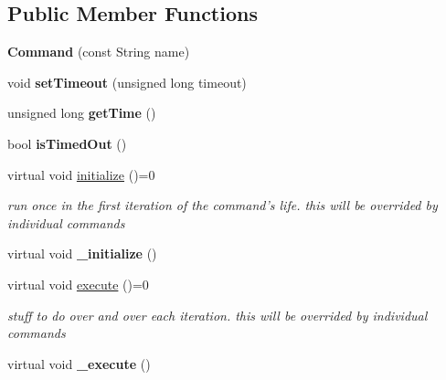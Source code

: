 \subsection*{Public Member Functions}
\begin{DoxyCompactItemize}
\item 
\hypertarget{classCommand_a5f939f31974c4955c486b18a07675698}{{\bfseries Command} (const String name)}\label{classCommand_a5f939f31974c4955c486b18a07675698}

\item 
\hypertarget{classCommand_adfbbaa47b15c80c2a713d24e48b843a8}{void {\bfseries set\-Timeout} (unsigned long timeout)}\label{classCommand_adfbbaa47b15c80c2a713d24e48b843a8}

\item 
\hypertarget{classCommand_a53de8c6445ccd2f51fe7535a71e20c98}{unsigned long {\bfseries get\-Time} ()}\label{classCommand_a53de8c6445ccd2f51fe7535a71e20c98}

\item 
\hypertarget{classCommand_ac62a4b3acc8db6c5e396d5c97ca51a98}{bool {\bfseries is\-Timed\-Out} ()}\label{classCommand_ac62a4b3acc8db6c5e396d5c97ca51a98}

\item 
\hypertarget{classCommand_af186abe582ab15ac64750e4b5d7944de}{virtual void \hyperlink{classCommand_af186abe582ab15ac64750e4b5d7944de}{initialize} ()=0}\label{classCommand_af186abe582ab15ac64750e4b5d7944de}

\begin{DoxyCompactList}\small\item\em run once in the first iteration of the command's life. this will be overrided by individual commands \end{DoxyCompactList}\item 
\hypertarget{classCommand_ae7c58ad4895c51ff18f1d432dbd4f4ec}{virtual void {\bfseries \-\_\-initialize} ()}\label{classCommand_ae7c58ad4895c51ff18f1d432dbd4f4ec}

\item 
\hypertarget{classCommand_a6fd7d9bd8df8bfc881e4d6c7cd1878b7}{virtual void \hyperlink{classCommand_a6fd7d9bd8df8bfc881e4d6c7cd1878b7}{execute} ()=0}\label{classCommand_a6fd7d9bd8df8bfc881e4d6c7cd1878b7}

\begin{DoxyCompactList}\small\item\em stuff to do over and over each iteration. this will be overrided by individual commands \end{DoxyCompactList}\item 
\hypertarget{classCommand_a49e6861e0c14411d6860f0b3211db9c9}{virtual void {\bfseries \-\_\-execute} ()}\label{classCommand_a49e6861e0c14411d6860f0b3211db9c9}


\end{DoxyCompactItemize}
